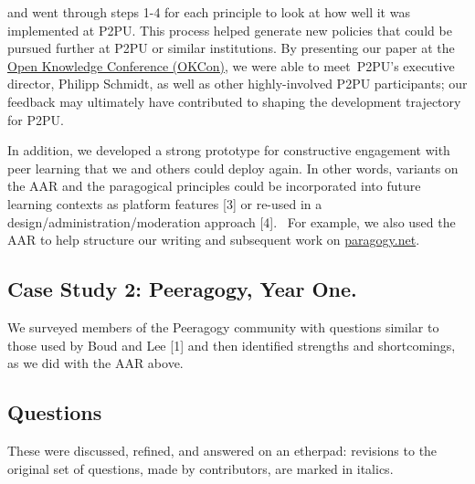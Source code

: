 and went through steps 1-4 for each principle to look at how well it was
implemented at P2PU. This process helped generate new policies that
could be pursued further at P2PU or similar institutions. By presenting
our paper at the \href{http://okfn.org/okcon/}{Open Knowledge Conference
(OKCon)}, we were able to meet~P2PU's executive director, Philipp
Schmidt, as well as other highly-involved P2PU participants; our
feedback may ultimately have contributed to shaping the development
trajectory for P2PU.

In addition, we developed a strong prototype for constructive engagement
with peer learning that we and others could deploy again. In other
words, variants on the AAR and the paragogical principles could be
incorporated into future learning contexts as platform features
{{[}3{]}} or re-used in a design/administration/moderation approach
{{[}4{]}}.~ For example, we also used the AAR to help structure our
writing and subsequent work on \href{http://paragogy.net}{paragogy.net}.

\subsection{Case Study 2: Peeragogy, Year
One.}\label{case-study-2-peeragogy-year-one.}

We surveyed members of the Peeragogy community with questions similar to
those used by Boud and Lee {{[}1{]}} and then identified strengths and
shortcomings, as we did with the AAR above.

\subsection{Questions}\label{questions}

These were discussed, refined, and answered on an etherpad: revisions to
the original set of questions, made by contributors, are marked in
italics.

